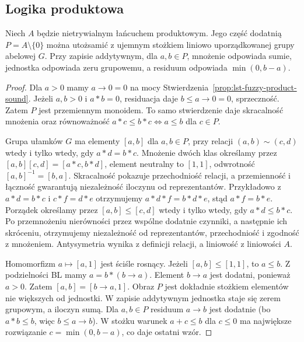\subsection{Logika produktowa}
\begin{lemat}
\label{lem:lst-fuzzy-product-group}
Niech $A$ będzie nietrywialnym łańcuchem produktowym.
Jego część dodatnią $P=A\setminus\{0\}$ można utożsamić
z ujemnym stożkiem liniowo uporządkowanej grupy
abelowej $G$. Przy zapisie addytywnym, dla $a,b\in P$,
mnożenie odpowiada sumie, jednostka odpowiada zeru
grupowemu, a residuum odpowiada $\min(0,b-a)$.
\end{lemat}
\begin{proof}
Dla $a>0$ mamy $a\to0=0$ na mocy
Stwierdzenia~\ref{prop:lst-fuzzy-product-sound}.
Jeżeli $a,b>0$ i $a*b=0$, residuacja daje
$b\leq a\to0=0$, sprzeczność. Zatem $P$ jest
przemiennym monoidem. To samo stwierdzenie daje
skracalność mnożenia oraz równoważność
$a*c\leq b*c\iff a\leq b$ dla $c\in P$.

Grupa ułamków $G$ ma elementy $[a,b]$ dla $a,b\in P$,
przy relacji $(a,b)\sim(c,d)$ wtedy i tylko wtedy,
gdy $a*d=b*c$. Mnożenie dwóch klas określamy
przez $[a,b][c,d]=[a*c,b*d]$,
element neutralny to $[1,1]$, odwrotność
$[a,b]^{-1}=[b,a]$. Skracalność pokazuje
przechodniość relacji, a przemienność i łączność
gwarantują niezależność iloczynu od reprezentantów.
Przykładowo z $a*d=b*c$ i $c*f=d*e$ otrzymujemy
$a*d*f=b*d*e$, stąd $a*f=b*e$.
Porządek określamy przez
$[a,b]\leq[c,d]$ wtedy i tylko wtedy, gdy $a*d\leq b*c$.
Po przemnożeniu nierówności przez wspólne dodatnie
czynniki, a następnie ich skróceniu, otrzymujemy
niezależność od reprezentantów, przechodniość
i zgodność z mnożeniem. Antysymetria wynika
z definicji relacji, a liniowość z liniowości $A$.

Homomorfizm $a\mapsto[a,1]$ jest ściśle rosnący.
Jeżeli $[a,b]\leq[1,1]$, to $a\leq b$.
Z podzielności BL mamy $a=b*(b\to a)$.
Element $b\to a$ jest dodatni, ponieważ $a>0$.
Zatem $[a,b]=[b\to a,1]$. Obraz $P$ jest dokładnie
stożkiem elementów nie większych od jednostki.
W zapisie addytywnym jednostka staje się zerem
grupowym, a iloczyn sumą. Dla $a,b\in P$
residuum $a\to b$ jest dodatnie (bo $a*b\leq b$,
więc $b\leq a\to b$). W stożku warunek
$a+c\leq b$ dla $c\leq0$ ma największe rozwiązanie
$c=\min(0,b-a)$, co daje ostatni wzór.
\end{proof}

